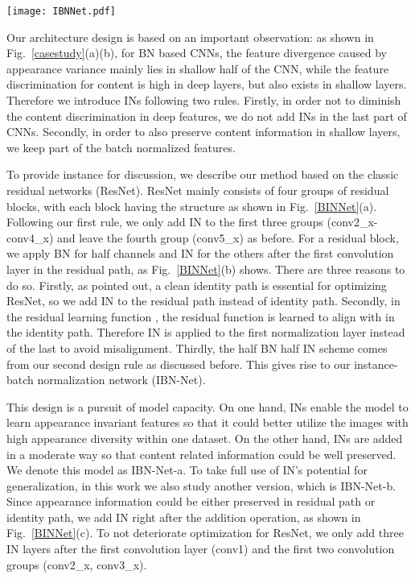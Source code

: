 \documentclass[runningheads]{llncs}
\begin{document}
\begin{figure*}[!t]
\centering
\texttt{[image: IBNNet.pdf]}
\caption{\label{BINNet} Instance-batch normalization (IBN) block. }
\end{figure*}

Our architecture design is based on an important observation: as shown in Fig.~\ref{casestudy}(a)(b), for BN based CNNs, the feature divergence caused by appearance variance mainly lies in shallow half of the CNN, while the feature discrimination for content is high in deep layers, but also exists in shallow layers.
Therefore we introduce INs following two rules.
Firstly, in order not to diminish the content discrimination in deep features, we do not add INs in the last part of CNNs.
Secondly, in order to also preserve content information in shallow layers, we keep part of the batch normalized features.

To provide instance for discussion, we describe our method based on the classic residual networks (ResNet).
ResNet mainly consists of four groups of residual blocks, with each block having the structure as shown in Fig.~\ref{BINNet}(a).
Following our first rule, we only add IN to the first three groups (conv2\_x-conv4\_x) and leave the fourth group (conv5\_x) as before.
For a residual block, we apply BN for half channels and IN for the others after the first convolution layer in the residual path, as Fig.~\ref{BINNet}(b) shows.
There are three reasons to do so.
Firstly, as \cite{he2016identity} pointed out, a clean identity path is essential for optimizing ResNet, so we add IN to the residual path instead of identity path.
Secondly, in the residual learning function , the residual function  is learned to align with  in the identity path. 
Therefore IN is applied to the first normalization layer instead of the last to avoid misalignment.
Thirdly, the half BN half IN scheme comes from our second design rule as discussed before.
This gives rise to our instance-batch normalization network (IBN-Net).


This design is a pursuit of model capacity. 
On one hand, INs enable the model to learn appearance invariant features so that it could better utilize the images with high appearance diversity within one dataset. 
On the other hand, INs are added in a moderate way so that content related information could be well preserved.
We denote this model as IBN-Net-a.
To take full use of IN's potential for generalization, in this work we also study another version, which is IBN-Net-b.
Since appearance information could be either preserved in residual path or identity path, we add IN right after the addition operation, as shown in Fig.~\ref{BINNet}(c).
To not deteriorate optimization for ResNet, we only add three IN layers after the first convolution layer (conv1) and the first two convolution groups (conv2\_x, conv3\_x).
\end{document}

